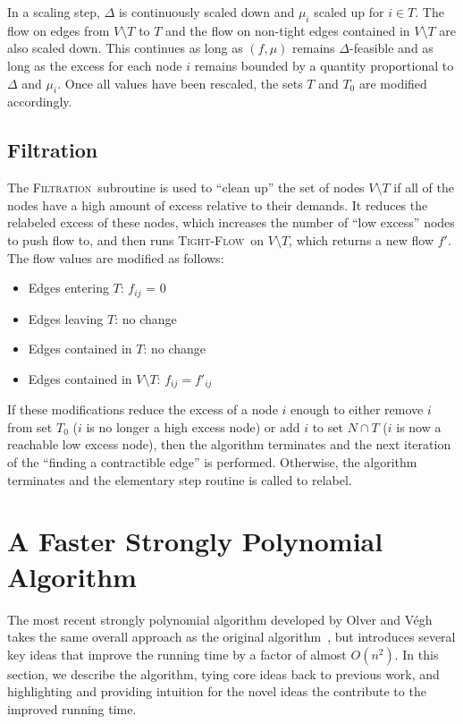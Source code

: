\documentclass[11pt]{article}
\theoremstyle{definition}
\theoremstyle{definition}
\newcommand{\tf}{\textsc{Tight-Flow}}
\newcommand{\filtration}{\textsc{Filtration}}
\newcommand{\todo}[1]{}%
\begin{document}
	In a scaling step, $\Delta$ is continuously scaled down
    and $\mu_i$ scaled up for $i \in T$. The flow on edges from $V \setminus T$ to $T$ and the flow
    on non-tight edges contained in $V \setminus T$ are also scaled down. This continues as long
    as $(f, \mu)$ remains $\Delta$-feasible and as long as the excess for each node $i$
    remains bounded by a quantity proportional to $\Delta$ and $\mu_i$.
    Once all values have been rescaled, the sets $T$ and $T_0$ are modified accordingly.  
	
	\subsection{Filtration}\label{sec:filtration}
    
	The \filtration\ subroutine is used to ``clean up'' the set of nodes $V \setminus T$ if
    all of the nodes have a high amount of excess relative to their demands. 
    It reduces the relabeled excess of these nodes,
    which increases the number of
    ``low excess'' nodes to push flow to,
    and then runs \tf\ on $V\setminus T$,
    which returns a new flow $f'$. The flow values are modified as follows: 
	\begin{itemize}[itemsep=-1mm]
	\item Edges entering $T$: $f_{ij}$ = 0
	\item Edges leaving $T$: no change
	\item Edges contained in $T$: no change
	\item Edges contained in $V\setminus T$: $f_{ij} = f'_{ij}$
	\end{itemize}
	
	If these modifications reduce the excess of a node $i$ enough to either remove $i$ from set $T_0$
    ($i$ is no longer a high excess node) or add $i$ to set $N \cap T$ ($i$ is now a reachable
    low excess node), then the algorithm terminates and the next iteration of the
    ``finding a contractible edge'' is performed. Otherwise, the algorithm terminates
    and the elementary step routine is called to relabel.

		\todo{Need to tie everything together somehow}
		\todo{Runtime analysis?}

\section{A Faster Strongly Polynomial Algorithm}\label{sec:2017}

The most recent strongly polynomial algorithm developed by Olver and Végh \cite{Olver2017} takes the same overall approach as the original algorithm~\cite{Vegh2013}, but introduces several key ideas that improve the running time by a factor of almost $O(n^2)$. 
In this section, we describe the algorithm, tying core ideas back to previous work, and highlighting and providing intuition for the novel ideas the contribute to the improved running time. 
\end{document}
